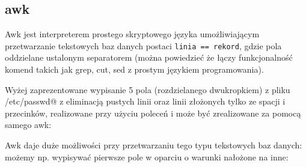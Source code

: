 % 
% 
% 
% 

\subsection{awk}

Awk jest interpreterem prostego skryptowego języka umożliwiającym przetwarzanie
tekstowych baz danych postaci \texttt{linia == rekord}, gdzie pola oddzielane ustalonym
separatorem (można powiedzieć że łączy funkcjonalność komend takich jak
grep, cut, sed z prostym językiem programowania).

Wyżej zaprezentowane wypisanie 5 pola (rozdzielanego dwukropkiem) z pliku \Verb@/etc/passwd@  z eliminacją
pustych linii oraz linii złożonych tylko ze spacji i przecinków,
realizowane przy użyciu poleceń \Verb@cut@ i \Verb@grep@ może być zrealizowane za pomocą samego awk:


Awk daje duże możliwości przy przetwarzaniu tego typu tekstowych baz danych:
możemy np. wypisywać pierwsze pole w oparciu o warunki nałożone na inne:


